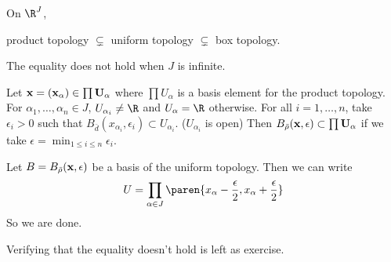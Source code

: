  On \(\R^J\),
\begin{center}
    product topology \(\subsetneq\) uniform topology \(\subsetneq\) box topology.
\end{center}
The equality does not hold when \(J\) is infinite.

\pf
{} Let \(\bf{x} = (x_\alpha) \in \prod U_\alpha\) where \(\prod U_\alpha\) is a basis element for the product topology. For \(\alpha_1, \dots, \alpha_n \in J\), \(U_{\alpha_i} \neq \R\) and \(U_\alpha = \R\) otherwise. For all \(i = 1, \dots, n\), take \(\epsilon_i > 0\) such that \(B_{\bar{d}}(x_{\alpha_i}, \epsilon_i) \subset U_{\alpha_i}\). (\(U_{\alpha_i}\) is open) Then \(B_{\bar{\rho}}(\bf{x}, \epsilon) \subset \prod U_\alpha\) if we take \(\epsilon = \min_{1\leq i\leq n} \epsilon_i\).

 Let \(B = B_{\bar{\rho}} (\bf{x}, \epsilon)\) be a basis of the uniform topology. Then we can write
\[
    U = \prod_{\alpha \in J} \paren{x_\alpha - \frac{\epsilon}{2}, x_\alpha + \frac{\epsilon}{2}}
\]
So we are done.

Verifying that the equality doesn't hold is left as exercise.
\pagebreak
